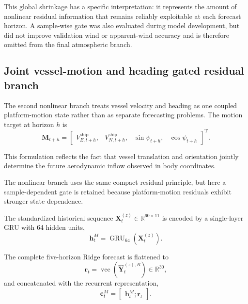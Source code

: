 This global shrinkage has a specific interpretation: it represents the amount of nonlinear residual information that remains reliably exploitable at each forecast horizon. A sample-wise gate was also evaluated during model development, but did not improve validation wind or apparent-wind accuracy and is therefore omitted from the final atmospheric branch.

\subsection{Joint vessel-motion and heading gated residual branch}
\label{subsec:motion_residual}

The second nonlinear branch treats vessel velocity and heading as one coupled platform-motion state rather than as separate forecasting problems. The motion target at horizon $h$ is
\begin{equation}
\mathbf M_{t+h}
=
\begin{bmatrix}
V^{\mathrm{ship}}_{E,t+h},
&
V^{\mathrm{ship}}_{N,t+h},
&
\sin\psi_{t+h},
&
\cos\psi_{t+h}
\end{bmatrix}^{\mathrm T}.
\label{eq:motion_target}
\end{equation}

This formulation reflects the fact that vessel translation and orientation jointly determine the future aerodynamic inflow observed in body coordinates.

The nonlinear branch uses the same compact residual principle, but here a sample-dependent gate is retained because platform-motion residuals exhibit stronger state dependence.

The standardized historical sequence
$\mathbf X_t^{(z)}\in\mathbb R^{60\times11}$
is encoded by a single-layer GRU with 64 hidden units,
\begin{equation}
\mathbf h_t^M
=
\operatorname{GRU}_{64}
\left(
\mathbf X_t^{(z)}
\right).
\label{eq:motion_gru}
\end{equation}

The complete five-horizon Ridge forecast is flattened to
\begin{equation}
\mathbf r_t
=
\operatorname{vec}
\left(
\hat{\mathbf Y}_t^{(z),R}
\right)
\in
\mathbb R^{30},
\label{eq:ridge_context}
\end{equation}
and concatenated with the recurrent representation,
\begin{equation}
\mathbf c_t^M
=
\begin{bmatrix}
\mathbf h_t^M;
\mathbf r_t
\end{bmatrix}.
\label{eq:motion_context}
\end{equation}

